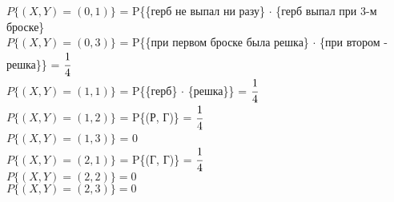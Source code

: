 $P\{(X, Y) = (0, 1)\}$ = P\{\{герб не выпал ни разу\} $\cdot$ \{герб выпал при 3-м броске\} \\
$P\{(X, Y) = (0, 3)\}$ = P\{\{при первом броске была решка\} $\cdot$ \{при втором - решка\}\} = $\cfrac{1}{4}$ \\
$P\{(X, Y) = (1, 1)\}$ = P\{\{герб\} $\cdot$ \{решка\}\} = $\cfrac{1}{4}$ \\
$P\{(X, Y) = (1, 2)\}$ = P\{(Р, Г)\} = $\cfrac{1}{4}$ \\
$P\{(X, Y) = (1, 3)\}$ = 0 \\
$P\{(X, Y) = (2, 1)\}$ = P\{(Г, Г)\} = $\cfrac{1}{4}$ \\
$P\{(X, Y) = (2, 2)\} = 0$ \\
$P\{(X, Y) = (2, 3)\} = 0$ \\



























